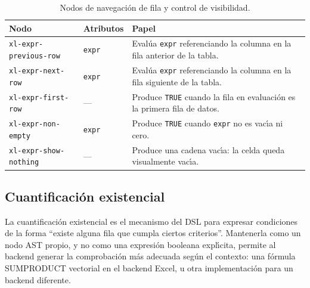 \begin{table}[h!]
\centering
\caption{Nodos de navegaci\'on de fila y control de visibilidad.}
\label{tab:ast-navegacion}
\renewcommand{\arraystretch}{1.3}
\begin{tabular}{p{3.8cm} p{3.8cm} p{6.2cm}}
\toprule
\textbf{Nodo} & \textbf{Atributos} & \textbf{Papel} \\
\midrule
\texttt{xl-expr-previous-row}
  & \texttt{expr}
  & Eval\'ua \texttt{expr} referenciando la columna en la
    fila anterior de la tabla. \\
\midrule
\texttt{xl-expr-next-row}
  & \texttt{expr}
  & Eval\'ua \texttt{expr} referenciando la columna en la
    fila siguiente de la tabla. \\
\midrule
\texttt{xl-expr-first-row}
  & ---
  & Produce \texttt{TRUE} cuando la fila en evaluaci\'on es la
    primera fila de datos. \\
\midrule
\texttt{xl-expr-non-empty}
  & \texttt{expr}
  & Produce \texttt{TRUE} cuando \texttt{expr} no es vac\'{\i}a
    ni cero. \\
\midrule
\texttt{xl-expr-show-nothing}
  & ---
  & Produce una cadena vac\'{\i}a: la celda queda visualmente
    vac\'{\i}a. \\
\bottomrule
\end{tabular}
\end{table}

\subsection{Cuantificaci\'on existencial}
\label{sec:ast-cuantificacion}

La cuantificaci\'on existencial es el mecanismo del DSL para expresar
condiciones de la forma ``existe alguna fila que cumpla ciertos criterios''.
Mantenerla como un nodo AST propio, y no como una expresi\'on booleana
expl\'{\i}cita, permite al backend generar la comprobaci\'on m\'as adecuada
seg\'un el contexto: una f\'ormula SUMPRODUCT vectorial en el backend Excel,
u otra implementaci\'on para un backend diferente.


